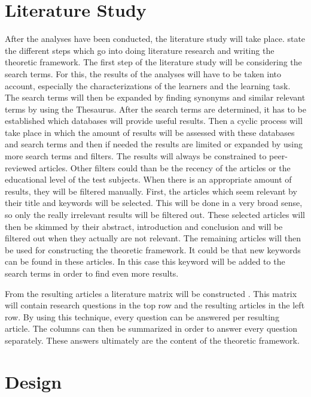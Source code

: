 \documentclass[12pt]{report} %
\begin{document}
\section{Literature Study}

After the analyses have been conducted, the literature study will take place.  state the different steps which go into doing literature research and writing the theoretic framework. The first step of the literature study will be considering the search terms. For this, the results of the analyses will have to be taken into account, especially the characterizations of the learners and the learning task. The search terms will then be expanded by finding synonyms and similar relevant terms by using the Thesaurus. After the search terms are determined, it has to be established which databases will provide useful results. Then a cyclic process will take place in which the amount of results will be assessed with these databases and search terms and then if needed the results are limited or expanded by using more search terms and filters. The results will always be constrained to peer-reviewed articles. Other filters could than be the recency of the articles or the educational level of the test subjects. When there is an appropriate amount of results, they will be filtered manually. First, the articles which seem relevant by their title and keywords will be selected. This will be done in a very broad sense, so only the really irrelevant results will be filtered out. These selected articles will then be skimmed by their abstract, introduction and conclusion and will be filtered out when they actually are not relevant. The remaining articles will then be used for constructing the theoretic framework. It could be that new keywords can be found in these articles. In this case this keyword will be added to the search terms in order to find even more results.

From the resulting articles a literature matrix will be constructed \cite{lerencomm}. This matrix will contain research questions in the top row and the resulting articles in the left row. By using this technique, every question can be answered per resulting article. The columns can then be summarized in order to answer every question separately. These answers ultimately are the content of the theoretic framework.

\section{Design}
\end{document}
